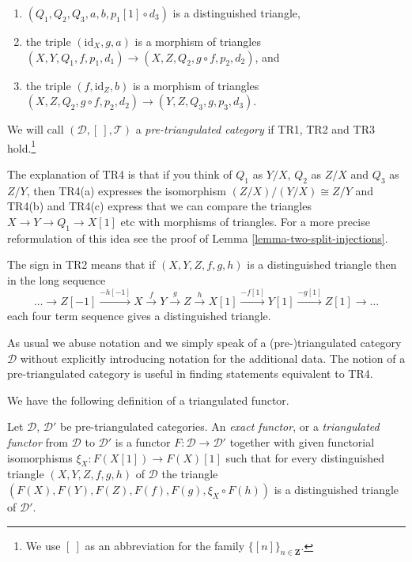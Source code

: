 \begin{definition}
\begin{enumerate}
\begin{enumerate}
\item $(Q_1, Q_2, Q_3, a, b, p_1[1] \circ d_3)$ is a
distinguished triangle,
\item the triple $(\text{id}_X, g, a)$ is
a morphism of triangles
$(X, Y, Q_1, f, p_1, d_1) \to (X, Z, Q_2, g \circ f, p_2, d_2)$, and
\item the triple $(f, \text{id}_Z, b)$ is a morphism of triangles
$(X, Z, Q_2, g \circ f, p_2, d_2) \to (Y, Z, Q_3, g, p_3, d_3)$.
\end{enumerate}
\end{enumerate}
We will call $(\mathcal{D}, [\ ], \mathcal{T})$ a
{\it pre-triangulated category} if TR1, TR2 and TR3
hold.\footnote{We use $[\ ]$ as an abbreviation for the
family $\{[n]\}_{n\in \mathbf{Z}}$.}
\end{definition}

\noindent
The explanation of TR4 is that if you think of $Q_1$ as
$Y/X$, $Q_2$ as $Z/X$ and $Q_3$ as $Z/Y$, then TR4(a) expresses
the isomorphism $(Z/X)/(Y/X) \cong Z/Y$ and TR4(b) and TR4(c)
express that we can compare the triangles $X \to Y \to Q_1 \to X[1]$
etc with morphisms of triangles. For a more precise reformulation
of this idea see the proof of Lemma \ref{lemma-two-split-injections}.

\medskip\noindent
The sign in TR2 means that if $(X, Y, Z, f, g, h)$ is a distinguished triangle
then in the long sequence
\begin{equation}
\label{equation-rotate}
\ldots \to
Z[-1] \xrightarrow{-h[-1]}
X \xrightarrow{f}
Y \xrightarrow{g}
Z \xrightarrow{h}
X[1] \xrightarrow{-f[1]}
Y[1] \xrightarrow{-g[1]}
Z[1] \to \ldots
\end{equation}
each four term sequence gives a distinguished triangle.

\medskip\noindent
As usual we abuse notation and we simply speak of a (pre-)triangulated
category $\mathcal{D}$ without explicitly introducing notation for the
additional data. The notion of a pre-triangulated category is
useful in finding statements equivalent to TR4.

\medskip\noindent
We have the following definition of a triangulated functor.

\begin{definition}
\label{definition-exact-functor-triangulated-categories}
Let $\mathcal{D}$, $\mathcal{D}'$ be pre-triangulated
categories. An {\it exact functor}, or a {\it triangulated functor}
from $\mathcal{D}$ to $\mathcal{D}'$ is a functor
$F : \mathcal{D} \to \mathcal{D}'$ together
with given functorial isomorphisms $\xi_X : F(X[1]) \to F(X)[1]$
such that for every distinguished triangle
$(X, Y, Z, f, g, h)$ of $\mathcal{D}$ the triangle
$(F(X), F(Y), F(Z), F(f), F(g), \xi_X \circ F(h))$
is a distinguished triangle of $\mathcal{D}'$.
\end{definition}

